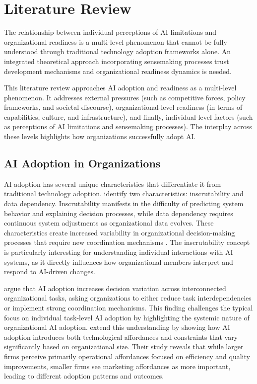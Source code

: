\section{Literature Review}
The relationship between individual perceptions of AI limitations and organizational readiness is a multi-level phenomenon that cannot be fully understood through traditional technology adoption frameworks alone. An integrated theoretical approach incorporating sensemaking processes trust development mechanisms and organizational readiness dynamics is needed.

This literature review approaches AI adoption and readiness as a multi-level phenomenon. It addresses external pressures (such as competitive forces, policy frameworks, and societal discourse), organizational-level readiness (in terms of capabilities, culture, and infrastructure), and finally, individual-level factors (such as perceptions of AI limitations and sensemaking processes). The interplay across these levels highlights how organizations successfully adopt AI.


\subsection{AI Adoption in Organizations}

AI adoption has several unique characteristics that differentiate it from traditional technology adoption. \cite{Weber2023} identify two characteristics: inscrutability and data dependency. Inscrutability manifests in the difficulty of predicting system behavior and explaining decision processes, while data dependency requires continuous system adjustments as organizational data evolves. These characteristics create increased variability in organizational decision-making processes that require new coordination mechanisms \citep{Agrawal2024}. The inscrutability concept is particularly interesting for understanding individual interactions with AI systems, as it directly influences how organizational members interpret and respond to AI-driven changes.

\cite{Agrawal2024} argue that AI adoption increases decision variation across interconnected organizational tasks, asking organizations to either reduce task interdependencies or implement strong coordination mechanisms. This finding challenges the typical focus on individual task-level AI adoption by highlighting the systemic nature of organizational AI adoption. \cite{Yang2024} extend this understanding by showing how AI adoption introduces both technological affordances and constraints that vary significantly based on organizational size. Their study reveals that while larger firms perceive primarily operational affordances focused on efficiency and quality improvements, smaller firms see marketing affordances as more important, leading to different adoption patterns and outcomes.

